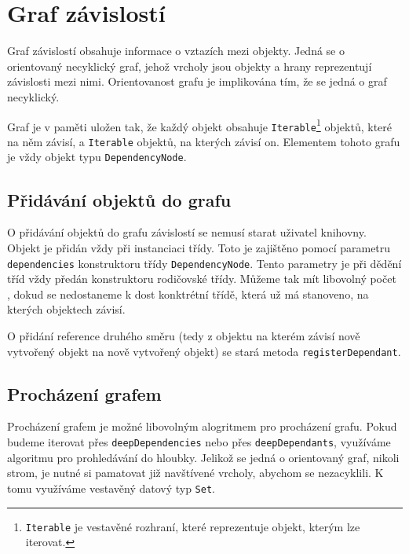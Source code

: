 \chapter{Graf závislostí}
\label{chap:dependency-graph}

Graf závislostí obsahuje informace o vztazích mezi  objekty.
Jedná se o orientovaný necyklický graf\cite{wikipedia:directed-graph}, jehož vrcholy jsou objekty a hrany reprezentují závislosti mezi nimi.
Orientovanost grafu je implikována tím, že se jedná o graf necyklický.

Graf je v paměti uložen tak, že každý objekt obsahuje \texttt{Iterable}\footnote{\texttt{Iterable} je vestavěné rozhraní, které reprezentuje objekt, kterým lze iterovat.} objektů, které na něm závisí, a \texttt{Iterable} objektů, na kterých závisí on\cite[line 17, 21]{geometryjs:source:interfaces:dependencyNode.ts}.
Elementem tohoto grafu je vždy objekt typu \texttt{DependencyNode}.

\section[Přidávání objektů]{Přidávání objektů do grafu}
\label{sec:adding-objects-to-graph}

O přidávání objektů do grafu závislostí se nemusí starat uživatel knihovny.
Objekt je přidán vždy při instanciaci třídy.
Toto je zajištěno pomocí parametru \texttt{dependencies} konstruktoru třídy \texttt{DependencyNode}\cite[line 13-17]{geometryjs:source:geometryObjects:dependencyNode.ts}.
Tento parametry je při dědění tříd vždy předán konstruktoru rodičovské třídy. 
Můžeme tak mít libovolný počet , dokud se nedostaneme k dost konktrétní třídě, která už má stanoveno, na kterých objektech závisí.

O přidání reference druhého směru (tedy z objektu na kterém závisí nově vytvořený objekt na nově vytvořený objekt) se stará metoda \texttt{registerDependant}\cite[line 32]{geometryjs:source:interfaces:dependencyNode.ts}.

\section[Procházení]{Procházení grafem}
\label{sec:traversing-the-graph}

Procházení grafem je možné libovolným alogritmem pro procházení grafu.
Pokud budeme iterovat přes \texttt{deepDependencies}\cite[line 17]{geometryjs:source:interfaces:dependencyNode.ts} nebo přes \texttt{deepDependants}\cite[line 21]{geometryjs:source:interfaces:dependencyNode.ts}, využíváme algoritmu pro prohledávání do hloubky\cite{wikipedia:depth-first-search}.
Jelikož se jedná o orientovaný graf, nikoli strom, je nutné si pamatovat již navštívené vrcholy, abychom se nezacyklili.
K tomu využíváme vestavěný datový typ \texttt{Set}.

